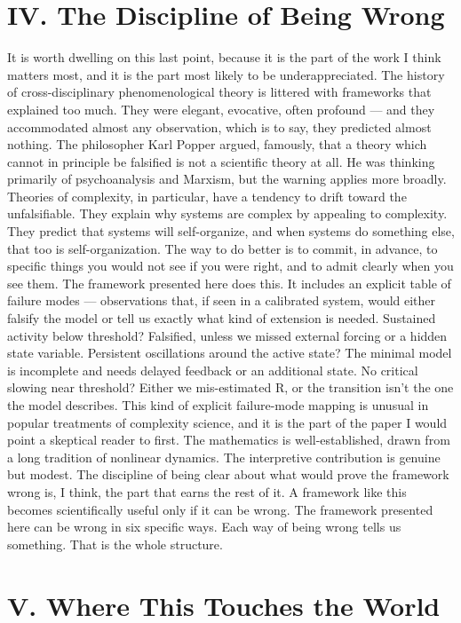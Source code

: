 \documentclass[12pt]{article}
\begin{document}
\section*{IV. The Discipline of Being Wrong}

It is worth dwelling on this last point, because it is the part of the work I think matters most, and it is the part most likely to be underappreciated. The history of cross-disciplinary phenomenological theory is littered with frameworks that explained too much. They were elegant, evocative, often profound --- and they accommodated almost any observation, which is to say, they predicted almost nothing. The philosopher Karl Popper argued, famously, that a theory which cannot in principle be falsified is not a scientific theory at all. He was thinking primarily of psychoanalysis and Marxism, but the warning applies more broadly. Theories of complexity, in particular, have a tendency to drift toward the unfalsifiable. They explain why systems are complex by appealing to complexity. They predict that systems will self-organize, and when systems do something else, that too is self-organization. The way to do better is to commit, in advance, to specific things you would not see if you were right, and to admit clearly when you see them. The framework presented here does this. It includes an explicit table of failure modes --- observations that, if seen in a calibrated system, would either falsify the model or tell us exactly what kind of extension is needed. Sustained activity below threshold? Falsified, unless we missed external forcing or a hidden state variable. Persistent oscillations around the active state? The minimal model is incomplete and needs delayed feedback or an additional state. No critical slowing near threshold? Either we mis-estimated R, or the transition isn't the one the model describes. This kind of explicit failure-mode mapping is unusual in popular treatments of complexity science, and it is the part of the paper I would point a skeptical reader to first. The mathematics is well-established, drawn from a long tradition of nonlinear dynamics. The interpretive contribution is genuine but modest. The discipline of being clear about what would prove the framework wrong is, I think, the part that earns the rest of it. A framework like this becomes scientifically useful only if it can be wrong. The framework presented here can be wrong in six specific ways. Each way of being wrong tells us something. That is the whole structure.


\section*{V. Where This Touches the World}
\end{document}
